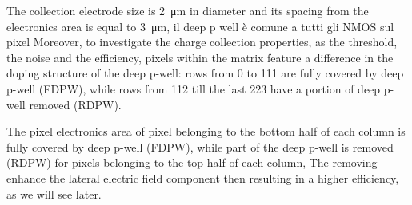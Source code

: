     The collection electrode size is \SI{2}{\um} in diameter and its spacing from the electronics area is equal to \SI{3}{\um}, il deep p well è comune a tutti gli NMOS sul pixel
    Moreover, to investigate the charge collection properties, as the threshold, the noise and the efficiency, pixels within the matrix feature a difference in the doping structure of the deep p-well: rows from 0 to 111 are fully covered by deep p-well (FDPW), while rows from 112 till the last 223 have a portion of deep p-well removed (RDPW).

    The pixel electronics area of pixel belonging to the bottom
half of each column is fully covered by deep p-well (FDPW), while part of the deep p-well is removed (RDPW)
for pixels belonging to the top half of each column,
    The removing enhance the lateral electric field component then resulting in a higher efficiency, as we will see later.\\

